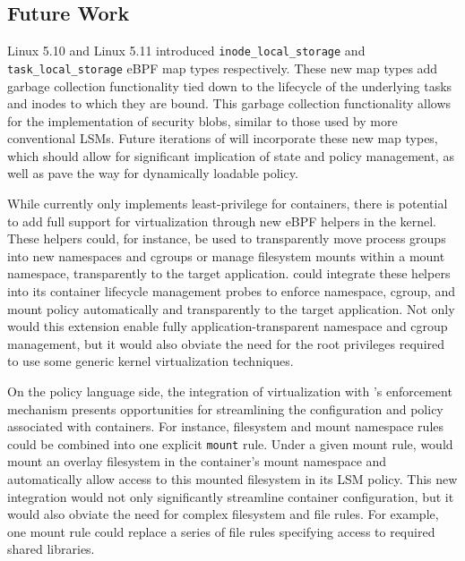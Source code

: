 \subsection{Future Work}
\label{sub:future_work}

Linux 5.10 and Linux 5.11 introduced \texttt{inode\_local\_storage} \cite{singh2020_inode_local_storage} and \texttt{task\_local\_storage} \cite{singh2020_task_local_storage} eBPF map types respectively. These new map types add garbage collection functionality tied down to the lifecycle of the underlying tasks and inodes to which they are bound. This garbage collection functionality allows for the implementation of security blobs, similar to those used by more conventional LSMs. Future iterations of \bpfcontain{} will incorporate these new map types, which should allow for significant implication of state and policy management, as well as pave the way for dynamically loadable \bpfcontain{} policy.

While \bpfcontain{} currently only implements least-privilege for containers, there is potential to add full support for virtualization through new eBPF helpers in the kernel. These helpers could, for instance, be used to transparently move process groups into new namespaces and cgroups or manage filesystem mounts within a mount namespace, transparently to the target application. \bpfcontain{} could integrate these helpers into its container lifecycle management probes to enforce namespace, cgroup, and mount policy automatically and transparently to the target application. Not only would this extension enable fully application-transparent namespace and cgroup management, but it would also obviate the need for the root privileges required to use some generic kernel virtualization techniques.

On the policy language side, the integration of virtualization with \bpfcontain{}'s enforcement mechanism presents opportunities for streamlining the configuration and policy associated with \bpfcontain{} containers. For instance, filesystem and mount namespace rules could be combined into one explicit \texttt{mount} rule. Under a given mount rule, \bpfcontain{} would mount an overlay filesystem in the container's mount namespace and automatically allow access to this mounted filesystem in its LSM policy. This new integration would not only significantly streamline container configuration, but it would also obviate the need for complex filesystem and file rules. For example, one mount rule could replace a series of file rules specifying access to required shared libraries.

